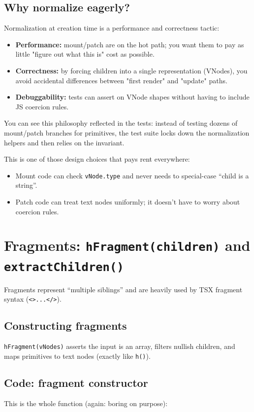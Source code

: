 \subsection*{Why normalize eagerly?}
Normalization at creation time is a performance and correctness tactic:

\begin{itemize}
  \item \textbf{Performance:} mount/patch are on the hot path; you want them to pay as little "figure out what this is" cost as possible.
  \item \textbf{Correctness:} by forcing children into a single representation (VNodes), you avoid accidental differences between "first render" and "update" paths.
  \item \textbf{Debuggability:} tests can assert on VNode shapes without having to include JS coercion rules.
\end{itemize}

You can see this philosophy reflected in the tests: instead of testing dozens of mount/patch branches for primitives, the test suite locks down the normalization helpers and then relies on the invariant.

This is one of those design choices that pays rent everywhere:

\begin{itemize}
  \item Mount code can check \texttt{vNode.type} and never needs to special-case ``child is a string''.
  \item Patch code can treat text nodes uniformly; it doesn't have to worry about coercion rules.
\end{itemize}

\section{Fragments: \texttt{hFragment(children)} and \texttt{extractChildren()}}
Fragments represent ``multiple siblings'' and are heavily used by TSX fragment syntax (\texttt{<>...</>}).

\subsection*{Constructing fragments}
	\texttt{hFragment(vNodes)} asserts the input is an array, filters nullish children, and maps primitives to text nodes (exactly like \texttt{h()}).

\subsection*{Code: fragment constructor}
This is the whole function (again: boring on purpose):

